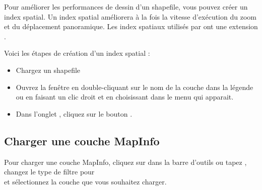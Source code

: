 Pour améliorer les performances de dessin d'un shapefile, vous pouvez créer un index spatial. Un  index spatial améliorera à la fois la vitesse d'exécution du zoom et du déplacement panoramique. Les index spatiaux utilisés par \qg ont une extension .

Voici les étapes de création d'un index spatial :

\begin{itemize}[label=--]
\item Chargez un shapefile
\item Ouvrez la fenêtre  en double-cliquant sur le nom de la couche dans la légende ou en faisant un clic droit et en choisissant  dans le menu qui apparait.
\item Dans l'onglet , cliquez sur le bouton .
\end{itemize}

\subsection{Charger une couche MapInfo}

Pour charger une couche MapInfo, cliquez sur  dans la barre d'outils ou tapez , changez le type de filtre pour\\  et sélectionnez la couche que vous souhaitez charger.

